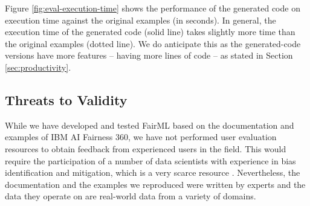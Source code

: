 \documentclass[sigconf]{acmart}
\begin{document}
{	Figure \ref{fig:eval-execution-time} shows the performance of the generated code on execution time against the original examples (in seconds). In general, the execution time of the generated code (solid line) takes slightly more time than the original examples (dotted line). 
	We do anticipate this as the generated-code versions have more features -- having more lines of code --
	as stated in Section \ref{sec:productivity}. 
	
	
	\subsection{Threats to Validity}
	\label{sec:threats_to_validity}	
	While we have developed and tested FairML based on the documentation and examples of IBM AI Fairness 360, we have not performed user evaluation resources to obtain feedback from experienced users in the field. This would require the participation of a number of data scientists with experience in bias identification and mitigation, which is a very scarce resource \cite{lee2021landscape}. Nevertheless, the documentation and the examples we reproduced were written by experts and the data they operate on are real-world data from a variety of domains.
	
}
\end{document}
